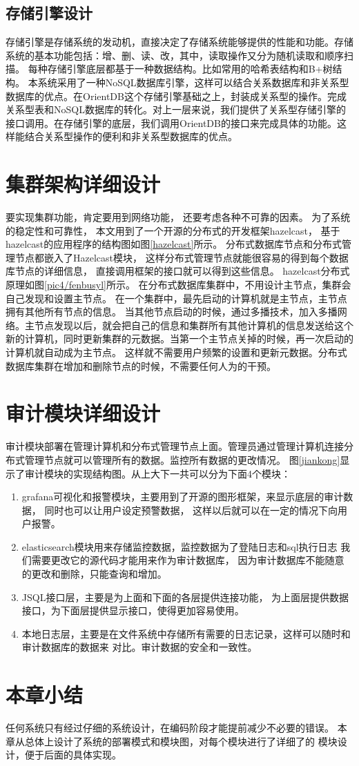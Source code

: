 \subsection{存储引擎设计}
存储引擎是存储系统的发动机，直接决定了存储系统能够提供的性能和功能。存储
系统的基本功能包括：增、删、读、改，其中，读取操作又分为随机读取和顺序扫描。
每种存储引擎底层都基于一种数据结构。比如常用的哈希表结构和B+树结构。
本系统采用了一种NoSQL数据库引擎，这样可以结合关系数据库和非关系型数据库的优点。在OrientDB这个存储引擎基础之上，封装成关系型的操作。完成关系型表和NoSQL数据库的转化。对上一层来说，我们提供了关系型存储引擎的接口调用。在存储引擎的底层，我们调用OrientDB的接口来完成具体的功能。这样能结合关系型操作的便利和非关系型数据库的优点。
\section{集群架构详细设计}
要实现集群功能，肯定要用到网络功能，
还要考虑各种不可靠的因素。
为了系统的稳定性和可靠性，
本文用到了一个开源的分布式的开发框架hazelcast，
基于hazelcast的应用程序的结构图如图\ref{hazelcast}所示。
分布式数据库节点和分布式管理节点都嵌入了Hazelcast模块，
这样分布式管理节点就能很容易的得到每个数据库节点的详细信息，
直接调用框架的接口就可以得到这些信息。
hazelcast分布式原理如图\ref{pic4/fenbusyl}所示。
在分布式数据库集群中，不用设计主节点，集群会自己发现和设置主节点。
在一个集群中，最先启动的计算机就是主节点，主节点拥有其他所有节点的信息。
当其他节点启动的时候，通过多播技术，加入多播网络。主节点发现以后，就会把自己的信息和集群所有其他计算机的信息发送给这个新的计算机，同时更新集群的元数据。当第一个主节点关掉的时候，再一次启动的计算机就自动成为主节点。
这样就不需要用户频繁的设置和更新元数据。分布式数据库集群在增加和删除节点的时候，不需要任何人为的干预。
\section{审计模块详细设计}
审计模块部署在管理计算机和分布式管理节点上面。管理员通过管理计算机连接分布式管理节点就可以管理所有的数据。监控所有数据的更改情况。
图\ref{jiankong}显示了审计模块的实现结构图。从上大下一共可以分为下面4个模块：
\begin{enumerate}[fullwidth,itemindent=2em,listparindent=2em]
	\item grafana可视化和报警模块，主要用到了开源的图形框架，来显示底层的审计数据，
	同时也可以让用户设定预警数据，
	这样以后就可以在一定的情况下向用户报警。
	\item elasticsearch模块用来存储监控数据，监控数据为了登陆日志和sql执行日志
	我们需要更改它的源代码才能用来作为审计数据库，
	因为审计数据库不能随意的更改和删除，只能查询和增加。
	\item JSQL接口层，主要是为上面和下面的各层提供连接功能，
	为上面层提供数据接口，为下面层提供显示接口，使得更加容易使用。
	\item 本地日志层，主要是在文件系统中存储所有需要的日志记录，这样可以随时和审计数据库的数据来
	对比。审计数据的安全和一致性。
\end{enumerate}
\section{本章小结}
任何系统只有经过仔细的系统设计，在编码阶段才能提前减少不必要的错误。
本章从总体上设计了系统的部署模式和模块图，对每个模块进行了详细了的
模块设计，便于后面的具体实现。